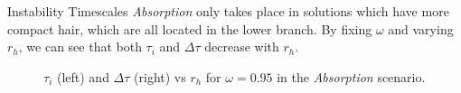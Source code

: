 \begin{block}{Instability Timescales}
\textit{Absorption} only takes place in solutions which have more compact hair, which are all located in the lower branch. By fixing $\omega$ and varying $r_h$, we can see that both $\tau_i$ and $\Delta \tau$ decrease with $r_h$.

\begin{figure}[h!]
    \centering
    \begin{minipage}[b]{0.49\textwidth}
        \centering
        
    \end{minipage}
    \hfill
    \begin{minipage}[b]{0.49\textwidth}
        \centering
        
    \end{minipage}
    \caption{$\tau_i$ (left) and $\Delta \tau$ (right) vs $r_h$ for $\omega = 0.95$ in the \textit{Absorption} scenario.}
\end{figure}

\vspace{-1.25em}  %

\end{block}
